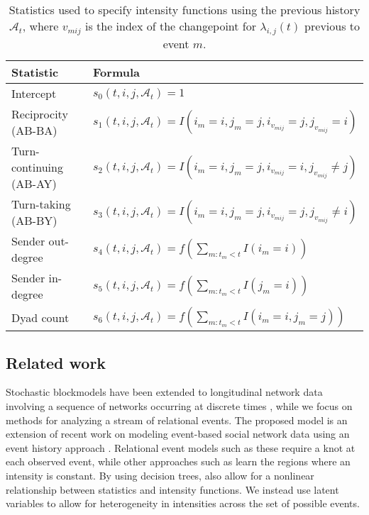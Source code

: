\begin{table}[t]
\footnotesize
\center
\begin{tabular}{|l|l|}
\hline
Statistic & Formula\\
\hline
\hline
Intercept& $s_{0}(t,i,j,\mathcal{A}_t) = 1$\\
Reciprocity (AB-BA)& $s_{1}(t,i,j,\mathcal{A}_t) = I(i_m=i,j_m=j,i_{v_{mij}}=j,j_{v_{mij}}=i)$\\
Turn-continuing (AB-AY)& $s_{2}(t,i,j,\mathcal{A}_t) =  I(i_m=i,j_m=j,i_{v_{mij}}=i,j_{v_{mij}}\ne j)$\\
Turn-taking (AB-BY)&$s_{3}(t,i,j,\mathcal{A}_t) = I(i_m=i,j_m=j,i_{v_{mij}}=j,j_{v_{mij}}\ne i)$\\
Sender out-degree& $s_{4}(t,i,j,\mathcal{A}_t) = f(\sum_{m:t_m<t} I(i_m=i) )$\\
Sender in-degree& $s_{5}(t,i,j,\mathcal{A}_t) = f(\sum_{m:t_m<t} I(j_m=i) )$\\
Dyad count& $s_{6}(t,i,j,\mathcal{A}_t) = f(\sum_{m:t_m<t} I(i_m=i,j_m=j) )$\\
\hline
\end{tabular}
\caption{Statistics used to specify intensity functions using the previous history $\mathcal{A}_t$, where $v_{mij}$ is the index of the changepoint for $\lambda_{i,j}(t)$ previous to event $m$.}
\label{tab:stats}
\end{table}

\subsection{Related work}
Stochastic blockmodels have been extended to longitudinal network data
involving a sequence of networks occurring at discrete times
\cite{Ishiguro2010, Rodriguez2011}, while we focus on methods for
analyzing a stream of relational events. 
The proposed model is an extension of recent work on modeling event-based social network data using an event history approach \cite{Butts2008,Brandes2009,Perry2011,Stadtfeld2011,Vu2011,Vu2011a}. %
Relational event models such as these require a knot at each observed event, while other approaches such as \cite{Gunawardana2011} learn the regions where an intensity is constant.
By using decision trees,  \cite{Gunawardana2011} also allow for a nonlinear relationship between statistics and intensity functions.  
We instead use latent variables to allow for heterogeneity in intensities across the set of possible events.

